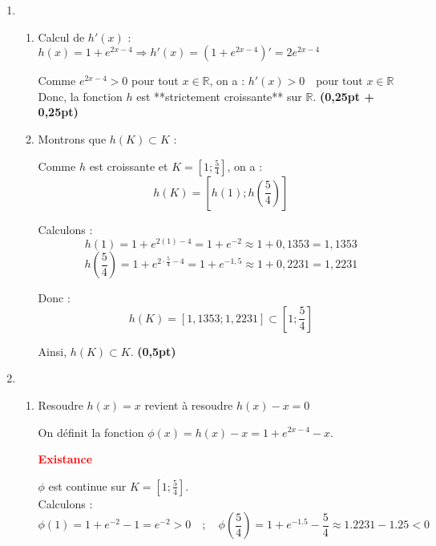 \documentclass[12pt,a4paper]{article}
\begin{document}
\begin{enumerate}
    \item
          \begin{enumerate}
              \item Calcul de \( h'(x) \) :
                  \(
                  h(x) = 1 + e^{2x - 4} \Rightarrow h'(x) =  \left(1 + e^{2x - 4} \right)' = 2e^{2x - 4}
                  \)

                  Comme \( e^{2x - 4} > 0 \) pour tout \( x \in \mathbb{R} \), on a :
                  \(
                  h'(x) > 0 \quad \text{pour tout } x \in \mathbb{R}
                  \)
                  Donc, la fonction \( h \) est **strictement croissante** sur \( \mathbb{R} \). \hfill \textbf{(0,25pt + 0,25pt)}

              \item Montrons que \( h(K) \subset K \) :

                  Comme \( h \) est croissante et \( K = \left[1 ; \frac{5}{4}\right] \), on a :
                  \[
                      h(K) = \left[ h(1) ; h\left(\frac{5}{4}\right) \right]
                  \]

                  Calculons :
                  \[
                      h(1) = 1 + e^{2(1) - 4} = 1 + e^{-2} \approx 1 + 0{,}1353 = 1{,}1353
                  \]
                  \[
                      h\left(\frac{5}{4}\right) = 1 + e^{2 \cdot \frac{5}{4} - 4} = 1 + e^{-1{,}5} \approx 1 + 0{,}2231 = 1{,}2231
                  \]

                  Donc :
                  \[
                      h(K) = \left[1{,}1353 ; 1{,}2231\right] \subset \left[1 ; \frac{5}{4}\right]
                  \]

                  Ainsi, \( h(K) \subset K \). \hfill \textbf{(0,5pt)}
          \end{enumerate}
    \item
          \begin{enumerate}
              \item Resoudre \( h(x) = x \)  revient à resoudre \( h(x) - x = 0 \)

                  On définit la fonction \( \phi(x) = h(x) - x = 1 + e^{2x - 4} - x \).

                  \textcolor{red}{\textbf{Existance}}

                  \( \phi \) est continue sur \( K = \left[1 ; \frac{5}{4} \right] \).\\
                  Calculons :
                  \[
                      \phi(1) = 1 + e^{-2} - 1 = e^{-2} > 0 \quad ; \quad \phi\left( \frac{5}{4} \right) = 1 + e^{-1.5} - \frac{5}{4} \approx 1.2231 - 1.25 < 0
                  \]


\end{enumerate}
\end{enumerate}
\end{document}
